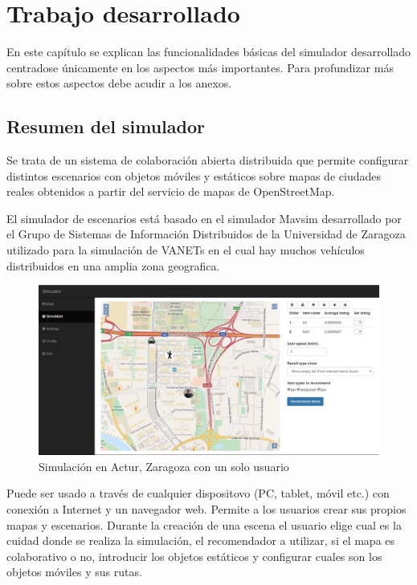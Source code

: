 \chapter{Trabajo desarrollado}
\thispagestyle{empty}


En este capítulo se explican las funcionalidades básicas del simulador desarrollado centradose únicamente en los aspectos más importantes. Para profundizar más sobre estos aspectos debe acudir a los anexos.

\section{Resumen del simulador}
\thispagestyle{empty}

Se trata de un sistema de colaboración abierta distribuida que permite configurar distintos escenarios con objetos móviles y estáticos sobre mapas de ciudades reales obtenidos a partir del servicio de mapas de OpenStreetMap. 

El simulador de escenarios está basado en el simulador Mavsim desarrollado por el Grupo de Sistemas de Información Distribuidos de la Universidad de Zaragoza utilizado para la simulación de VANETs en el cual hay muchos vehículos distribuidos en una amplia zona geografica.

\begin{figure}[H]
\centering\includegraphics[scale=0.3]{imagenes/resumen-simulador.jpg}
\caption{Simulación en Actur, Zaragoza con un solo usuario}
\label{c2_trama}
\end{figure}

Puede ser usado a través de cualquier dispositovo (PC, tablet, móvil etc.) con conexión a Internet y un navegador web. Permite a los usuarios crear sus propios mapas y escenarios. Durante la creación de una escena el usuario elige cual es la cuidad donde se realiza la simulación, el recomendador a utilizar, si el mapa es colaborativo o no, introducir los objetos estáticos y configurar cuales son los objetos móviles y sus rutas. 

